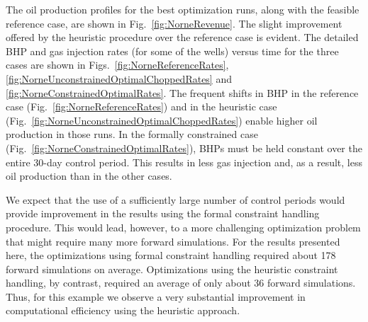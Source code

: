 \documentclass[twocolumn,numbook]{svjour3}          %
\begin{document}
The oil production profiles for the best optimization runs, along with the
feasible reference case, are shown in Fig.~\ref{fig:NorneRevenue}. The slight
improvement offered by the heuristic procedure over the reference case is
evident. The detailed BHP and gas injection rates (for some of the wells) versus time for the three
cases are shown in Figs.~\ref{fig:NorneReferenceRates},
\ref{fig:NorneUnconstrainedOptimalChoppedRates} and
\ref{fig:NorneConstrainedOptimalRates}. The frequent shifts in BHP in the
reference case (Fig.~\ref{fig:NorneReferenceRates}) and in the heuristic
case (Fig.~\ref{fig:NorneUnconstrainedOptimalChoppedRates}) enable higher
oil production in those runs. In the formally constrained case
(Fig.~\ref{fig:NorneConstrainedOptimalRates}), BHPs must be held constant over
the entire 30-day control period. This results in less gas injection and, as a
result, less oil production than in the other cases.


We expect that the use of a sufficiently large number of control periods would
provide improvement in the results using the formal constraint handling
procedure. This would lead, however, to a more challenging optimization problem
that might require many more forward simulations. 
For the results presented
here, the optimizations using formal constraint handling required about 178
forward simulations on average. Optimizations using the heuristic constraint
handling, by contrast, required an average of only about 36 forward simulations. Thus, for this example we
observe a very substantial improvement in computational efficiency using the
heuristic approach.
\end{document}
